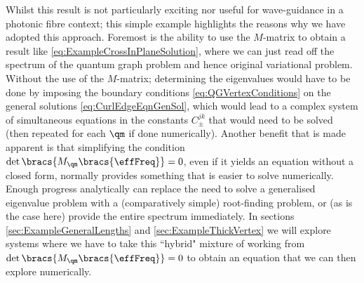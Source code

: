 Whilst this result is not particularly exciting nor useful for wave-guidance in a photonic fibre context; this simple example highlights the reasons why we have adopted this approach.
Foremost is the ability to use the $M$-matrix to obtain a result like \eqref{eq:ExampleCrossInPlaneSolution}, where we can just read off the spectrum of the quantum graph problem and hence original variational problem.
Without the use of the $M$-matrix; determining the eigenvalues would have to be done by imposing the boundary conditions \eqref{eq:QGVertexConditions} on the general solutions \eqref{eq:CurlEdgeEqnGenSol}, which would lead to a complex system of simultaneous equations in the constants $C_{\pm}^{jk}$ that would need to be solved (then repeated for each $\qm$ if done numerically).
Another benefit that is made apparent is that simplifying the condition $\det\bracs{M_{\qm}\bracs{\effFreq}} = 0$, even if it yields an equation without a closed form, normally provides something that is easier to solve numerically.
Enough progress analytically can replace the need to solve a generalised eigenvalue problem with a (comparatively simple) root-finding problem, or (as is the case here) provide the entire spectrum immediately.
In sections \ref{sec:ExampleGeneralLengths} and \ref{sec:ExampleThickVertex} we will explore systems where we have to take this ``hybrid" mixture of working from $\det\bracs{M_{\qm}\bracs{\effFreq}} = 0$ to obtain an equation that we can then explore numerically.

